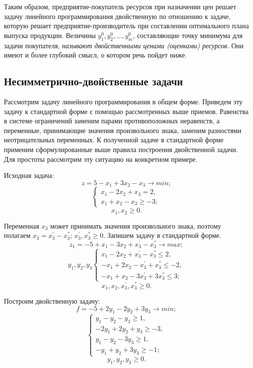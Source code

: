 Таким образом, предприятие-покупатель ресурсов при назначении цен решает задачу линейного программирования двойственную по отношению к задаче, которую решает предприятие-производитель при составлении оптимального плана выпуска продукции. Величины $y^0_1, y^0_2, \ldots, y^0_m$, составляющие точку минимума для задачи покупателя, \textit{называют двойственными ценами (оценками) ресурсов}. Они имеют и более глубокий смысл, о котором речь пойдет ниже.

\subsection{Несимметрично-двойственные задачи}

Рассмотрим задачу линейного программирования в общем форме. Приведем эту задачу к стандартной форме с помощью рассмотренных выше приемов. Равенства в системе ограничений заменим парами противоположных  неравенств, а переменные,  принимающие значения  произвольного  знака, заменим разностями неотрицательных переменных. К полученной задаче в стандартной форме применим сформулированные выше правила построения двойственной задачи. Для простоты рассмотрим эту ситуацию на конкретном примере.

Исходная задача:
\[
z = 5 - x_1 + 3x_2 - x_3 \rightarrow min;
\]
\[
\begin{cases}
x_1 - 2x_2 + x_3 = 2, \\
x_1 + x_2 - x_3 \ge -3;
\end{cases}
\]
\[
x_1, x_2 \ge 0.
\]

Переменная  $x_3$ может принимать значения произвольного знака, поэтому полагаем $x_3 = x^{'}_3 - x^{''}_3$; $x^{'}_3, x^{''}_3 \ge 0$.   Запишем задачу в стандартной форме.
\[
z_1 = -5 + x_1 - 3x_2 + x^{'}_3 - x^{''}_3 \rightarrow max;
\]
\[
y_1, y_2, y_3
\begin{cases}
x_1 - 2x_2 + x^{'}_3 - x^{''}_3 \le 2, \\
-x_1 + 2x_2 - x^{'}_3 + x^{''}_3 \le -2, \\
-x_1 + x_2 - 3x^{'}_3 + 3x^{''}_3 \le 3;
\end{cases}
\]
\[
x_1, x_2, x^{'}_3, x^{''}_3 \ge 0.
\]

Построим двойственную задачу:
\[
f = -5 + 2y_1 - 2y_2 + 3y_3 \rightarrow min;
\]
\[
\begin{cases}
y_1 - y_2 - y_3 \ge 1, \\
-2y_1 + 2y_2 + y_3 \ge -3, \\
y_1 - y_2 - 3y_3 \ge 1, \\
-y_1 + y_2 + 3y_3 \ge -1;
\end{cases}
\]
\[
y_1, y_2, y_3 \ge 0.
\]


